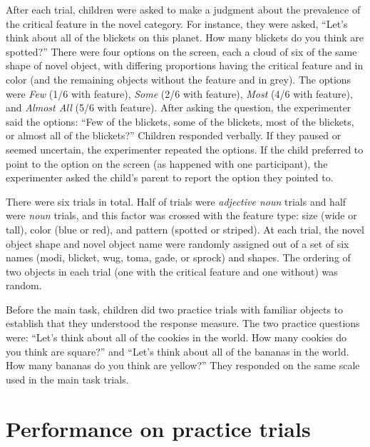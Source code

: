 \documentclass{ucetd}
\begin{document}
After each trial, children were asked to make a judgment about the
prevalence of the critical feature in the novel category. For instance,
they were asked, ``Let's think about all of the blickets on this planet.
How many blickets do you think are spotted?'' There were four options on
the screen, each a cloud of six of the same shape of novel object, with
differing proportions having the critical feature and in color (and the
remaining objects without the feature and in grey). The options were
\emph{Few} (1/6 with feature), \emph{Some} (2/6 with feature),
\emph{Most} (4/6 with feature), and \emph{Almost All} (5/6 with
feature). After asking the question, the experimenter said the options:
``Few of the blickets, some of the blickets, most of the blickets, or
almost all of the blickets?'' Children responded verbally. If they
paused or seemed uncertain, the experimenter repeated the options. If
the child preferred to point to the option on the screen (as happened
with one participant), the experimenter asked the child's parent to
report the option they pointed to.

There were six trials in total. Half of trials were \emph{adjective
noun} trials and half were \emph{noun} trials, and this factor was
crossed with the feature type: size (wide or tall), color (blue or red),
and pattern (spotted or striped). At each trial, the novel object shape
and novel object name were randomly assigned out of a set of six names
(modi, blicket, wug, toma, gade, or sprock) and shapes. The ordering of
two objects in each trial (one with the critical feature and one
without) was random.

Before the main task, children did two practice trials with familiar
objects to establish that they understood the response measure. The two
practice questions were: ``Let's think about all of the cookies in the
world. How many cookies do you think are square?'' and ``Let's think
about all of the bananas in the world. How many bananas do you think are
yellow?'' They responded on the same scale used in the main task trials.

\hypertarget{performance-on-practice-trials}{%
\section{Performance on practice
trials}\label{performance-on-practice-trials}}
\end{document}
